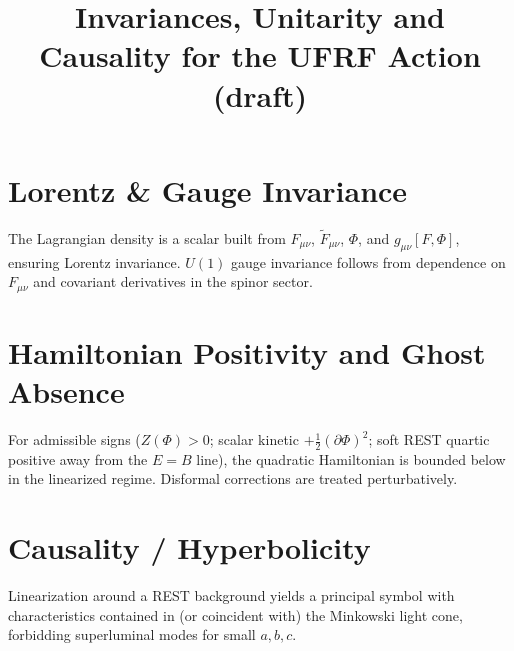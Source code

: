 \documentclass[11pt]{article}
\title{Invariances, Unitarity and Causality for the UFRF Action (draft)}
\begin{document}
\maketitle
\section*{Lorentz \& Gauge Invariance}
The Lagrangian density is a scalar built from $F_{\mu\nu}$, $\tilde F_{\mu\nu}$, $\Phi$, and $g_{\mu\nu}[F,\Phi]$, ensuring Lorentz invariance. $U(1)$ gauge invariance follows from dependence on $F_{\mu\nu}$ and covariant derivatives in the spinor sector.

\section*{Hamiltonian Positivity and Ghost Absence}
For admissible signs ($Z(\Phi)>0$; scalar kinetic $+\tfrac12(\partial\Phi)^2$; soft REST quartic positive away from the $E=B$ line), the quadratic Hamiltonian is bounded below in the linearized regime. Disformal corrections are treated perturbatively.

\section*{Causality / Hyperbolicity}
Linearization around a REST background yields a principal symbol with characteristics contained in (or coincident with) the Minkowski light cone, forbidding superluminal modes for small $a,b,c$.
\end{document}
